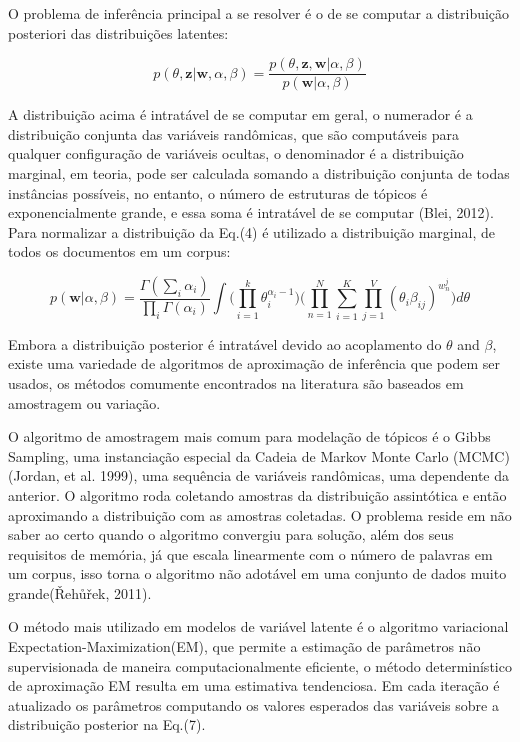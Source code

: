 \documentclass[12pt,a4paper]{article}
\begin{document}
  O problema de inferência principal a se resolver é o de se computar a distribuição posteriori das distribuições latentes:
  
  \begin{equation}
  p(\theta,\textbf{z}|\textbf{w},\alpha,\beta) = \frac{p(\theta,\textbf{z},\textbf{w}|\alpha,\beta)}{p(\textbf{w}|\alpha,\beta)}
  \end{equation}
  
  A distribuição acima é intratável de se computar em geral, o numerador é a distribuição conjunta das variáveis randômicas, que são computáveis para qualquer configuração de variáveis ocultas, o denominador é a distribuição marginal, em teoria, pode ser calculada somando a distribuição conjunta de todas instâncias possíveis, no entanto, o número de estruturas de tópicos é exponencialmente grande, e essa soma é intratável de se computar (Blei, 2012). Para normalizar a distribuição da Eq.(4) é utilizado a distribuição marginal, de todos os documentos em um corpus:
  
  \begin{equation}
  p(\textbf{w}|\alpha,\beta)=\frac{\Gamma(\sum_{i}\alpha_i)}{\prod_{i}\Gamma(\alpha_i)}\int{\Bigg(\prod_{i=1}^{k}\theta_i^{\alpha_i-1}\Bigg)} \Bigg(\prod_{n=1}^{N}\sum_{i=1}^{K}\prod_{j=1}^{V}(\theta_i\beta_{ij})^{w_n^j}\Bigg)d\theta
  \end{equation}
  
  Embora a distribuição posterior é intratável devido ao acoplamento do $\theta$ and $\beta$, existe uma variedade de algoritmos de aproximação de inferência que podem ser usados, os métodos comumente encontrados na literatura são baseados em amostragem ou variação.
  
  O algoritmo de amostragem mais comum para modelação de tópicos é o Gibbs Sampling, uma instanciação especial da Cadeia de Markov Monte Carlo (MCMC) (Jordan, et al. 1999), uma sequência de variáveis randômicas, uma dependente da anterior. O algoritmo roda coletando amostras da distribuição assintótica e então aproximando a distribuição com as amostras coletadas. O problema reside em não saber ao certo  quando o algoritmo convergiu para solução, além dos seus requisitos de memória, já que escala linearmente com o número de palavras em um corpus, isso torna o algoritmo não adotável em uma conjunto de dados muito grande(Řehůřek, 2011).
  
  O método mais utilizado em modelos de variável latente é o algoritmo variacional Expectation-Maximization(EM), que permite a estimação de parâmetros não supervisionada de maneira computacionalmente eficiente, o método determinístico de aproximação EM resulta em uma estimativa tendenciosa. Em cada iteração é atualizado os parâmetros computando os valores esperados das variáveis sobre a distribuição posterior na Eq.(7).
  
\end{document}
